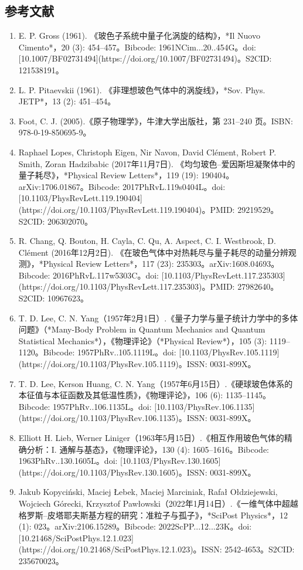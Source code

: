 \subsection{参考文献}
\begin{enumerate}
\item E. P. Gross (1961). 《玻色子系统中量子化涡旋的结构》，*Il Nuovo Cimento*，20 (3): 454–457。Bibcode: 1961NCim...20..454G。doi: [10.1007/BF02731494](https://doi.org/10.1007/BF02731494)。S2CID: 121538191。
\item L. P. Pitaevskii (1961). 《非理想玻色气体中的涡旋线》，*Sov. Phys. JETP*，13 (2): 451–454。
\item Foot, C. J. (2005).《原子物理学》，牛津大学出版社，第 231–240 页。ISBN: 978-0-19-850695-9。
\item Raphael Lopes, Christoph Eigen, Nir Navon, David Clément, Robert P. Smith, Zoran Hadzibabic (2017年11月7日). 《均匀玻色–爱因斯坦凝聚体中的量子耗尽》，*Physical Review Letters*，119 (19): 190404。arXiv:1706.01867。Bibcode: 2017PhRvL.119s0404L。doi: [10.1103/PhysRevLett.119.190404](https://doi.org/10.1103/PhysRevLett.119.190404)。PMID: 29219529。S2CID: 206302070。
\item R. Chang, Q. Bouton, H. Cayla, C. Qu, A. Aspect, C. I. Westbrook, D. Clément (2016年12月2日). 《在玻色气体中对热耗尽与量子耗尽的动量分辨观测》，*Physical Review Letters*，117 (23): 235303。arXiv:1608.04693。Bibcode: 2016PhRvL.117w5303C。doi: [10.1103/PhysRevLett.117.235303](https://doi.org/10.1103/PhysRevLett.117.235303)。PMID: 27982640。S2CID: 10967623。
\item T. D. Lee, C. N. Yang（1957年2月1日）.《量子力学与量子统计力学中的多体问题》（*Many-Body Problem in Quantum Mechanics and Quantum Statistical Mechanics*），《物理评论》（*Physical Review*），105 (3): 1119–1120。Bibcode: 1957PhRv..105.1119L。doi: [10.1103/PhysRev.105.1119](https://doi.org/10.1103/PhysRev.105.1119)。ISSN: 0031-899X。
\item T. D. Lee, Kerson Huang, C. N. Yang（1957年6月15日）.《硬球玻色体系的本征值与本征函数及其低温性质》，《物理评论》，106 (6): 1135–1145。Bibcode: 1957PhRv..106.1135L。doi: [10.1103/PhysRev.106.1135](https://doi.org/10.1103/PhysRev.106.1135)。ISSN: 0031-899X。
\item Elliott H. Lieb, Werner Liniger（1963年5月15日）.《相互作用玻色气体的精确分析：I. 通解与基态》，《物理评论》，130 (4): 1605–1616。Bibcode: 1963PhRv..130.1605L。doi: [10.1103/PhysRev.130.1605](https://doi.org/10.1103/PhysRev.130.1605)。ISSN: 0031-899X。
\item Jakub Kopyciński, Maciej Łebek, Maciej Marciniak, Rafał Ołdziejewski, Wojciech Górecki, Krzysztof Pawłowski（2022年1月14日）.《一维气体中超越格罗斯–皮塔耶夫斯基方程的研究：准粒子与孤子》，*SciPost Physics*，12 (1): 023。arXiv:2106.15289。Bibcode: 2022ScPP...12...23K。doi: [10.21468/SciPostPhys.12.1.023](https://doi.org/10.21468/SciPostPhys.12.1.023)。ISSN: 2542-4653。S2CID: 235670023。

\end{enumerate}
